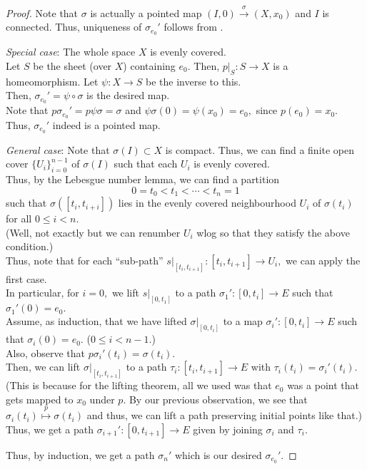 \documentclass[12pt]{article}
\theoremstyle{definition}
\numberwithin{thm}{section}
\begin{document}
\begin{proof} 
	Note that $\sigma$ is actually a pointed map $(I, 0) \overset{\sigma}{\longrightarrow} (X, x_0)$ and $I$ is connected. Thus, uniqueness of $\sigma_{e_0}'$ follows from .

	\emph{Special case}: The whole space $X$ is evenly covered. \\
	Let $S$ be the sheet (over $X$) containing $e_0.$ Then, $p|_S : S \to X$ is a homeomorphism. Let $\psi:X \to S$ be the inverse to this.\\
	Then, $\sigma_{e_0}' = \psi\circ\sigma$ is the desired map.\\
	Note that $p\sigma_{e_0}' = p\psi\sigma = \sigma$ and $\psi\sigma(0) = \psi(x_0) = e_0,$ since $p(e_0) = x_0.$ Thus, $\sigma_{e_0}'$ indeed is a pointed map.

	\emph{General case}: Note that $\sigma(I) \subset X$ is compact. Thus, we can find a finite open cover $\{U_i\}_{i = 0}^{n-1}$ of $\sigma(I)$ such that each $U_i$ is evenly covered.\\
	Thus, by the Lebesgue number lemma, we can find a partition
	\begin{equation*} 
		0 = t_0 < t_1 < \cdots < t_n = 1
	\end{equation*}
	such that $\sigma([t_i, t_{i + i}])$ lies in the evenly covered neighbourhood $U_i$ of $\sigma(t_i)$ for all $0 \le i < n.$\\
	(Well, not exactly but we can renumber $U_i$ wlog so that they satisfy the above condition.)\\
	Thus, note that for each ``sub-path'' $s|_{[t_i, t_{i + 1}]} : [t_i, t_{i + 1}] \to U_i,$ we can apply the first case.\\
	In particular, for $i = 0,$ we lift $s|_{[0, t_1]}$ to a path $\sigma_1':[0, t_i] \to E$ such that $\sigma_1'(0) = e_0.$\\
	Assume, as induction, that we have lifted $\sigma|_{[0, t_i]}$ to a map $\sigma_i':[0, t_i] \to E$ such that $\sigma_i(0) = e_0.$ ($0 \le i < n - 1.$)\\
	Also, observe that $p\sigma_i'(t_i) = \sigma(t_i).$\\
	Then, we can lift $\sigma|_{[t_i, t_{i + 1}]}$ to a path $\tau_i:[t_i, t_{i + 1}] \to E$ with $\tau_i(t_i) = \sigma_i'(t_{i}).$ (This is because for the lifting theorem, all we used was that $e_0$ was a point that gets mapped to $x_0$ under $p$. By our previous observation, we see that $\sigma_i(t_i) \overset{p}{\mapsto}\sigma(t_i)$ and thus, we can lift a path preserving initial points like that.)\\
	Thus, we get a path $\sigma_{i+1}':[0, t_{i + 1}] \to E$ given by joining $\sigma_i$ and $\tau_i.$

	Thus, by induction, we get a path $\sigma_n'$ which is our desired $\sigma_{e_0}'.$	
\end{proof}
\end{document}
